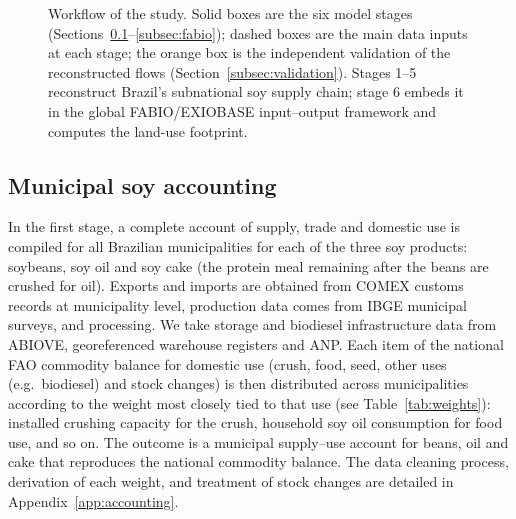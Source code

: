 \documentclass[pdflatex,sn-nature]{sn-jnl}%
\begin{document}
\begin{figure}[htbp]
\caption{Workflow of the study. Solid boxes are the six model stages
(Sections~\ref{subsec:accounting}--\ref{subsec:fabio}); dashed boxes are
the main data inputs at each stage; the orange box is the independent
validation of the reconstructed flows (Section~\ref{subsec:validation}).
Stages 1--5 reconstruct Brazil's subnational soy supply chain; stage 6 embeds
it in the global FABIO/EXIOBASE input--output framework and computes the
land-use footprint.}\label{fig:workflow}
\end{figure}

\subsection{Municipal soy accounting}\label{subsec:accounting}
In the first stage, a complete account of supply, trade and domestic use is
compiled for all Brazilian municipalities for each of the three soy
products: soybeans, soy oil and soy cake (the protein meal remaining after
the beans are crushed for oil). Exports and imports are obtained from COMEX
customs records at municipality level, production data comes from IBGE
municipal surveys, and processing. We take storage and biodiesel infrastructure
data from ABIOVE, georeferenced warehouse registers and ANP. Each
item of the national FAO commodity balance for domestic use (crush, food,
seed, other uses (e.g.\ biodiesel) and stock changes) is then distributed
across municipalities according to the weight most closely tied to that use
(see Table~\ref{tab:weights}): installed crushing capacity for the crush,
household soy oil consumption for food use, and so on. The outcome is a
municipal supply--use account for beans, oil and cake that reproduces the
national commodity balance. The data cleaning process, derivation of each
weight, and treatment of stock changes are detailed in
Appendix~\ref{app:accounting}.
\end{document}
